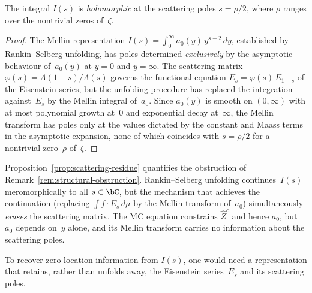 \begin{proposition}%
\label{prop:scattering-residue}%
\ClaimStatusProvedHere%
%
%
The integral $I(s)$ is \emph{holomorphic} at the scattering
poles $s = \rho/2$, where $\rho$ ranges over the nontrivial
zeros of~$\zeta$.
\end{proposition}

\begin{proof}
The Mellin representation
$I(s) = \int_0^\infty a_0(y)\,y^{s-2}\,dy$, established
by Rankin--Selberg unfolding, has poles determined
\emph{exclusively} by the asymptotic behaviour
of~$a_0(y)$ at $y=0$ and $y=\infty$. The scattering matrix
$\varphi(s) = \Lambda(1{-}s)/\Lambda(s)$ governs the
functional equation $E_s = \varphi(s)\,E_{1-s}$ of the
Eisenstein series, but the unfolding procedure has replaced
the integration against~$E_s$ by the Mellin integral
of~$a_0$. Since $a_0(y)$ is smooth on $(0,\infty)$ with at
most polynomial growth at~$0$ and exponential decay
at~$\infty$, the Mellin transform has poles only at the
values dictated by the constant and Maass terms in the
asymptotic expansion, none of which coincides with
$s = \rho/2$ for a nontrivial zero~$\rho$ of~$\zeta$.
\end{proof}

\begin{remark}%
\label{rem:structural-obstruction-revisited}%
%
Proposition~\ref{prop:scattering-residue} quantifies the
obstruction of Remark~\ref{rem:structural-obstruction}.
Rankin--Selberg unfolding continues~$I(s)$ meromorphically
to all $s\in\bC$, but the mechanism that achieves the
continuation (replacing $\int f\cdot E_s\,d\mu$ by the
Mellin transform of~$a_0$) simultaneously \emph{erases}
the scattering matrix. The MC equation constrains
$\widehat{Z}^c$ and hence $a_0$, but $a_0$ depends on~$y$
alone, and its Mellin transform carries no information about
the scattering poles.

To recover zero-location information from $I(s)$, one would
need a representation that retains, rather than unfolds away,
the Eisenstein series~$E_s$ and its scattering poles.
\end{remark}

